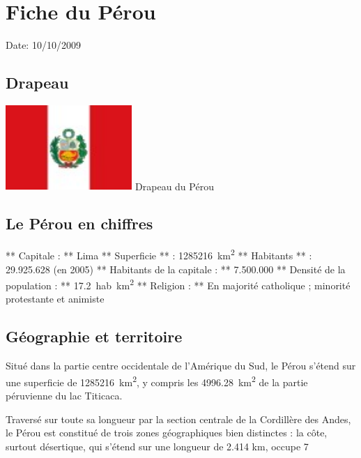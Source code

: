 \section{Fiche du Pérou}

Date: 10/10/2009

\begin{multicols}{2}

\subsection{Drapeau}

\hspace*{-0.65cm}
\includegraphics[width=4.8cm]{articles/Fiche-du-perou/1255177646Fug0.jpg}
Drapeau du Pérou

\subsection{Le Pérou en chiffres}

** Capitale : ** Lima
** Superficie ** : \SI{1285216}{km^2}
** Habitants ** : 29.925.628 (en 2005)
** Habitants de la capitale : ** 7.500.000
** Densité de la population : ** \SI{17,2}{hab.km^2}
** Religion : ** En majorité catholique ; minorité protestante et animiste

\subsection{Géographie et territoire}

Situé dans la partie centre occidentale de l'Amérique du Sud, le Pérou s'étend sur une superficie de \SI{1285216}{km^2}, y compris les \SI{4996.28}{km^2} de la partie péruvienne du lac Titicaca.

Traversé sur toute sa longueur par la section centrale de la Cordillère des Andes, le Pérou est constitué de trois zones géographiques bien distinctes : la côte, surtout désertique, qui s'étend sur une longueur de 2.414 km, occupe 7%


\end{multicols}
